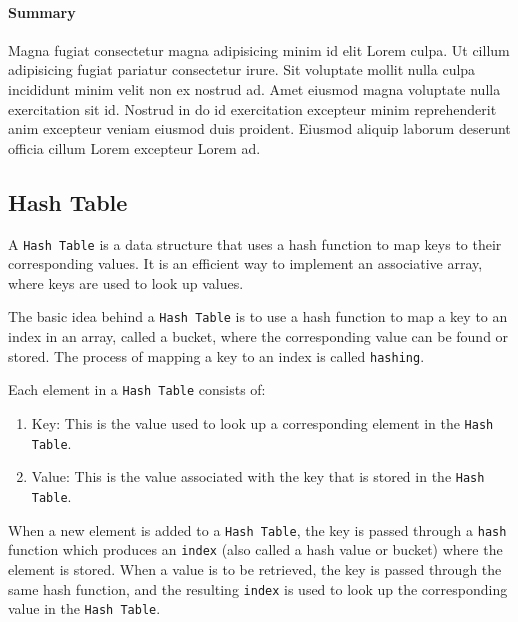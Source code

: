 \paragraph{Summary}
Magna fugiat consectetur magna adipisicing minim id elit Lorem culpa. Ut cillum adipisicing fugiat pariatur consectetur irure. Sit voluptate mollit nulla culpa incididunt minim velit non ex nostrud ad. Amet eiusmod magna voluptate nulla exercitation sit id. Nostrud in do id exercitation excepteur minim reprehenderit anim excepteur veniam eiusmod duis proident. Eiusmod aliquip laborum deserunt officia cillum Lorem excepteur Lorem ad.

\subsection{Hash Table}
A \lstinline{Hash Table} is a data structure that uses a hash function to map keys to their corresponding values. It is an efficient way to implement an associative array, where keys are used to look up values.

The basic idea behind a \lstinline{Hash Table} is to use a hash function to map a key to an index in an array, called a bucket, where the corresponding value can be found or stored. The process of mapping a key to an index is called \lstinline{hashing}.

Each element in a \lstinline{Hash Table} consists of:
\begin{enumerate}
    \item Key: This is the value used to look up a corresponding element in the \lstinline{Hash Table}.
    \item Value: This is the value associated with the key that is stored in the \lstinline{Hash Table}.
\end{enumerate}

When a new element is added to a \lstinline{Hash Table}, the key is passed through a \lstinline{hash} function which produces an \lstinline{index} (also called a hash value or bucket) where the element is stored.
When a value is to be retrieved, the key is passed through the same hash function, and the resulting \lstinline{index} is used to look up the corresponding value in the \lstinline{Hash Table}.

